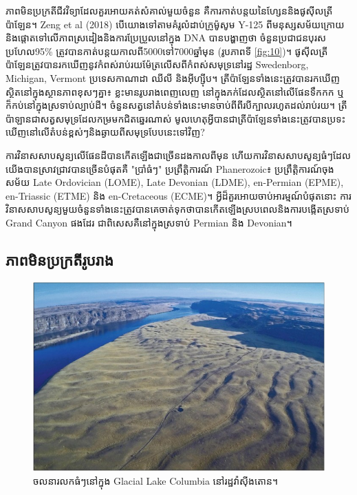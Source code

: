 \documentclass[10pt,twocolumn,letterpaper]{article}
\begin{document}
ភាពមិនប្រក្រតីជីវវិទ្យាដែលគួរអោយគត់សំគាល់មួយចំនួន គឺការកាត់បន្តយនៃហ្សែននិងផូសុីលត្រីប៉ាឡែន។ Zeng et al (2018) បើយោងទៅតាមគំរូលំដាប់ក្រូម៉ូសូម Y-125 ពីមនុស្សសម័យក្រោយ និងផ្តោតទៅលើភាពស្រដៀងនិងការប្រែប្រួលនៅក្នុង DNA បានបង្ហាញថា ចំនួនប្រជាជនបុរសប្រហែល95\% ត្រូវបានកាត់បន្តយកាលពី5000ទៅ7000ឆ្នាំមុន (រូបភាពទី \ref{fig:10})\cite{62}។ ផូសុីលត្រីប៉ាឡែនត្រូវបានរកឃើញនូវកំពស់រាប់រយម៉ែត្រលើសពីកំពស់សមុទ្រនៅរដ្ឋ Swedenborg, Michigan, Vermont ប្រទេសកាណាដា ឈីលី និងអ៊ីហ្ស៊ីប\cite{63,64,65,66}។ ត្រីប៉ាឡែនទាំងនេះត្រូវបានរកឃើញស្ថិតនៅក្នុងស្ថានភាពខុសៗគ្នា៖ ខ្លះមានរូបរាងពេញលេញ នៅក្នុងភក់ដែលស្ថិតនៅលើផែនទឹកកក ឬក៏កប់នៅក្នុងស្រទាប់ល្បាប់ដី។ ចំនួនសត្វនៅតំបន់ទាំងនេះមានចាប់ពីពីរបីក្បាលរហូតដល់រាប់រយ។ ត្រីប៉ាឡានជាសត្វសមុទ្រដែលកម្រមកជិតឆ្នេរណាស់ មូលហេតុអ្វីបានជាត្រីប៉ាឡែនទាំងនេះត្រូវបានប្រទះឃើញនៅលើតំបន់ខ្ពស់ៗនិងឆ្ងាយពីសមុទ្របែបនេះទៅវិញ?

ការវិនាសសាបសូន្យលើផែនដីបានកើតឡើងជាច្រើនដងកាលពីមុន ហើយការវិនាសសាបសូន្យធំៗដែលយើងបានស្រាវជ្រាវបានច្រើនបំផុតគឺ "ប្រាំធំៗ" ប្រព្រឹត្តិការណ៍ Phanerozoic៖ ប្រព្រឹត្តិការណ៍ចុងសម័យ Late Ordovician (LOME), Late Devonian (LDME), en-Permian (EPME), en-Triassic (ETME) និង en-Cretaceous (ECME)\cite{88,89}។ អ្វីដ៏គួរអោយចាប់អារម្មណ៍បំផុតនោះ ការវិនាសសាបសូន្យមួយចំនួនទាំងនេះត្រូវបានគេចាត់ទុកថាបានកើតឡើងស្របពេលនិងការបង្កើតស្រទាប់ Grand Canyon ផងដែរ ជាពិសេសគឺនៅក្នុងស្រទាប់ Permian និង Devonian។

\subsection{ភាពមិនប្រក្រតីរូបរាង}

\begin{figure}[b]
\begin{center}
   \includegraphics[width=1\linewidth]{columbia.jpg}
\end{center}
   \caption{ចលនារលកធំៗនៅក្នុង Glacial Lake Columbia នៅរដ្ឋវ៉ាស៊ីងតោន\cite{80}។}
\label{fig:11}
\label{fig:onecol}
\end{figure}
\end{document}
